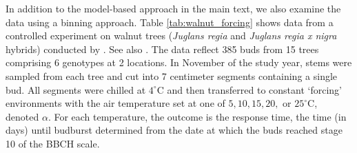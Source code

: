 \documentclass[12pt,letterpaper]{article}
\begin{document}
In addition to the model-based approach in the main text, we also examine the data using a binning approach.  
Table \ref{tab:walnut_forcing} shows data from a controlled experiment on walnut trees
(\textit{Juglans regia} and \textit{Juglans regia x nigra} hybrids) conducted by \cite{Charrier:2011aa}. 
See also \cite{guillaume2018assessing}. The data reflect 385 buds from 15 trees comprising 6 genotypes at 2
locations. In November of the study year, stems were sampled from each
tree and cut into 7 centimeter segments containing a single bud. All
segments were chilled at \(4^\circ\)C and then transferred to constant
`forcing' environments with the air temperature set at one of \(5,10,15,20,\)
or \(25^\circ\)C, denoted \(\alpha\). For each temperature, the outcome is the response
time, the time (in days) until budburst determined from the date at
which the buds reached stage 10 of the BBCH scale.
\end{document}

